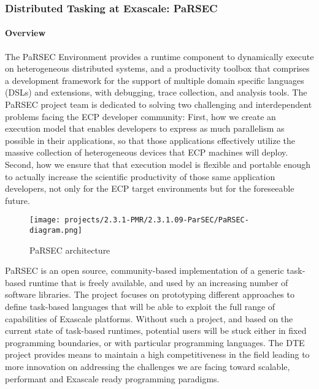 \subsubsection{ Distributed Tasking at Exascale: PaRSEC}


\paragraph{Overview}

The PaRSEC Environment provides a runtime component to dynamically execute on
heterogeneous distributed systems, and a productivity toolbox that comprises a
development framework for the support of multiple domain specific languages
(DSLs) and extensions, with debugging, trace collection, and analysis tools.
%
The PaRSEC project team is dedicated to solving two challenging and
interdependent problems facing the ECP developer community: First, how we create
an execution model that enables developers to express as much parallelism as
possible in their applications, so that those applications effectively utilize
the massive collection of heterogeneous devices that ECP machines will deploy.
Second, how we ensure that that execution model is flexible and portable enough
to actually increase the scientific productivity of those same application
developers, not only for the ECP target environments but for the foreseeable
future.
\begin{wrapfigure}{l}{.6\linewidth}
  \texttt{[image: projects/2.3.1-PMR/2.3.1.09-ParSEC/PaRSEC-diagram.png]}
  \caption{PaRSEC architecture\label{fig:parsec}}
\end{wrapfigure}
%
PaRSEC is an open source, community-based implementation of a generic task-based
runtime that is freely available, and used by an increasing number of software
libraries.
The project focuses on prototyping different approaches to define task-based
languages that will be able to exploit the full range of capabilities of
Exascale platforms. Without such a project, and based on the current state of
task-based runtimes, potential users will be stuck either in fixed programming
boundaries, or with particular programming languages. The DTE project provides
means to maintain a high competitiveness in the field leading to more innovation
on addressing the challenges we are facing toward scalable, performant and
Exascale ready programming paradigms.

